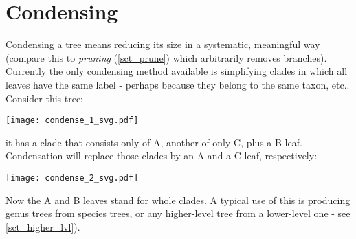 \section{Condensing}
\label{sct_condense}

Condensing a tree means reducing its size in a systematic, meaningful way
(compare this to \emph{pruning} (\ref{sct_prune}) which arbitrarily removes
branches). Currently the only condensing method available is simplifying
clades in which all leaves have the same label - perhaps because they belong
to the same taxon, etc.. Consider this tree:

\texttt{[image: condense\_1\_svg.pdf]}

it has a clade that consists only of A, another of only C, plus a B leaf.
Condensation will replace those clades by an A and a C leaf, respectively:


\texttt{[image: condense\_2\_svg.pdf]}

Now the A and B leaves stand for whole clades.  A typical use of this is
producing genus trees from species trees, or any higher-level tree from a
lower-level one - see \ref{sct_higher_lvl}).
